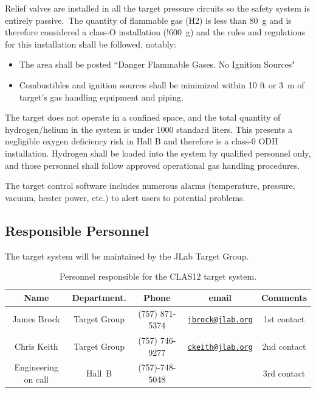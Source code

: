 Relief valves are installed in all the target pressure circuits so the safety system is entirely passive.~The quantity of flammable gas (H2) is less than 80~g and is therefore considered a class-O installation (!600~g) and the rules and regulations for this installation shall be followed, notably:

\begin{itemize}
\item The area shall be posted ``Danger Flammable Gases. No Ignition Sources" 
\item Combustibles and ignition sources shall be minimized within 10 ft or 3~m of target’s gas handling equipment and piping.
\end{itemize}

The target does not operate in a confined space, and the total quantity of hydrogen/helium in the system is under 1000 standard liters. This presents a negligible oxygen deficiency risk in Hall B and therefore is a class-0 ODH installation.  Hydrogen shall be loaded into the system by qualified personnel only, and those personnel shall follow approved operational gas handling procedures.

The target control software includes numerous alarms (temperature, pressure, vacuum, heater power, etc.) to alert users to potential problems.

\subsection{Responsible Personnel}

The target system will be maintained by the JLab Target Group.  

\begin{table}[!htb]
\centering
\begin{tabular}{|c|c|c|c|c|}
\hline
 Name&Department.&Phone&email&Comments \\ \hline
James Brock & Target Group &(757) 871-5374&\href{mailto:jbrock@jlab.org}{\nolinkurl{jbrock@jlab.org}} &1st contact \\ \hline
Chris Keith & Target Group &(757) 746-9277&\href{mailto:ckeith@jlab.org}{\nolinkurl{ckeith@jlab.org}}  &2nd contact \\ \hline
Engineering on call & Hall~B&(757)-748-5048&& 3rd contact  \\ \hline
\end{tabular}
\caption{Personnel responsible for the CLAS12 target system.} 
\label{tb:target}
\end{table}
